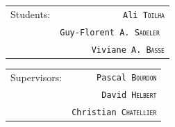 \begin{titlepage}


\begin{center}
\begin{tabular}{l r}

Students: &  \texttt{Ali \textsc{Toilha}}\\
& \texttt{Guy-Florent A. \textsc{Sadeler} }\\ %
&  \texttt{Viviane A. \textsc{Basse}}

\end{tabular}
\end{center}

\vspace*{1cm}
\begin{center}
\begin{tabular}{l r}
Supervisors: & \texttt{Pascal \textsc{Bourdon}}\\
& \texttt{David \textsc{Helbert}}  \\   %
& \texttt{Christian \textsc{Chatellier}} 
\end{tabular}
\end{center}

\end{titlepage}